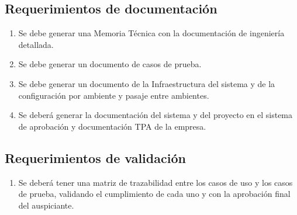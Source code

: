\subsection{Requerimientos de documentación}
\begin{enumerate}[label=3.\arabic*]
\item Se debe generar una Memoria Técnica con la documentación de ingeniería detallada.
\item Se debe generar un documento de casos de prueba.
\item Se debe generar un documento de la Infraestructura del sistema y de la configuración por ambiente y pasaje entre  ambientes.
\item Se deberá generar la documentación del sistema y del proyecto en el sistema de aprobación y documentación TPA de la empresa.
\end{enumerate}
\subsection{Requerimientos de validación}
\begin{enumerate}[label=4.\arabic*]
\item Se deberá tener una matriz de trazabilidad entre los casos de uso y los casos de prueba, validando el cumplimiento de cada uno y con la aprobación final del auspiciante.
\end{enumerate}

